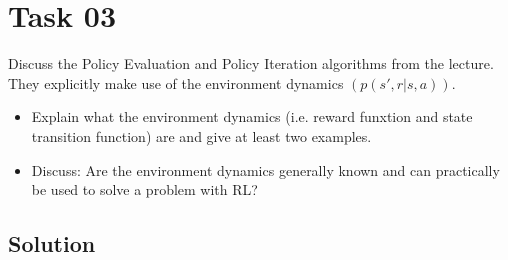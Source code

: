 \documentclass{article}
\begin{document}
\section{Task 03}
Discuss the Policy Evaluation and Policy Iteration algorithms from the lecture.
They explicitly make use of the environment dynamics $(p(s', r | s, a))$.
\begin{itemize}
    \item Explain what the environment dynamics (i.e. reward funxtion and
    state transition function) are and give at least two examples.
    \item Discuss: Are the environment dynamics generally known and can practically
    be used to solve a problem with RL?
\end{itemize}
\subsection{Solution}




\end{document}
